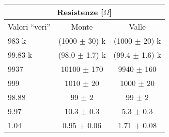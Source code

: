 \begin{table}[h]
  \centering
  \small
  \begin{tabular}{l | c c}
      \multicolumn{3}{c}{\textbf{Resistenze [$\Omega$]}} \\
      \toprule
      Valori ``veri'' & Monte & Valle \\
      \midrule
      983 k   & (1000 $\pm$ 30) k & (1000 $\pm$ 20) k \\
      99.83 k & (98.0 $\pm$ 1.7) k & (99.4 $\pm$ 1.6) k \\
      9937 & 10100 $\pm$ 170 & 9940 $\pm$ 160 \\
      999    & 1010 $\pm$ 20 & 1000 $\pm$ 20 \\
      98.88  & 99 $\pm$ 2 & 99 $\pm$ 2 \\
      9.97   & 10.3 $\pm$ 0.3 & 5.3 $\pm$ 0.3 \\
      1.04   & 0.95 $\pm$ 0.06 & 1.71 $\pm$ 0.08 \\
      \bottomrule
  \end{tabular}
\end{table}
